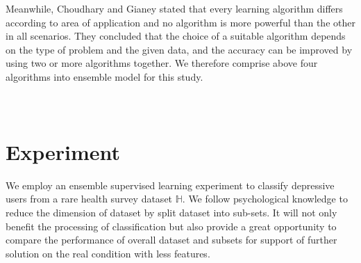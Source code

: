 \documentclass[12pt]{article}
\begin{document}
Meanwhile, Choudhary and Gianey \cite{Choudhary} stated that every learning algorithm differs according to area of application and no algorithm is more powerful than the other in all scenarios. They concluded that the choice of a suitable algorithm depends on the type of problem and the given data, and the accuracy can be improved by using two or more algorithms together. We therefore comprise above four algorithms into ensemble model for this study.
\\
\\
\\

\bigskip
\goodbreak
\section{Experiment}
We employ an ensemble supervised learning experiment to classify depressive users from a rare health survey dataset $\mathbb{H}$. We follow psychological knowledge to reduce the dimension of dataset by split dataset into sub-sets. It will not only benefit the processing of classification but also provide a great opportunity to compare the performance of overall dataset and subsets for support of further solution on the real condition with less features.
\end{document}
